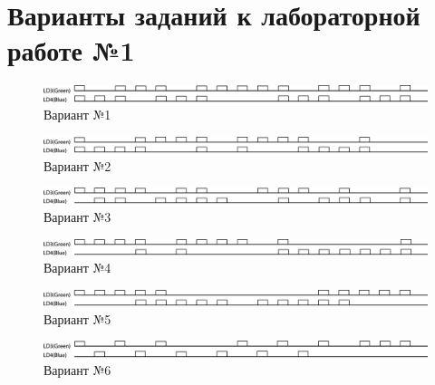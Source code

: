 \section{Варианты заданий к лабораторной работе №1}
\label{Lab1Var}
\begin{figure}[H]
\begin{center}
\includegraphics[scale=0.3]{Image/79.jpg} 
\end{center}
\caption{Вариант №1}
\end{figure}
\begin{figure}[H]
\begin{center}
\includegraphics[scale=0.3]{Image/80.jpg} 
\end{center}
\caption{Вариант №2}
\end{figure}
\begin{figure}[H]
\begin{center}
\includegraphics[scale=0.3]{Image/81.jpg} 
\end{center}
\caption{Вариант №3}
\end{figure}
\begin{figure}[H]
\begin{center}
\includegraphics[scale=0.3]{Image/82.jpg} 
\end{center}
\caption{Вариант №4}
\end{figure}
\begin{figure}[H]
\begin{center}
\includegraphics[scale=0.3]{Image/83.jpg} 
\end{center}
\caption{Вариант №5}
\end{figure}
\begin{figure}[H]
\begin{center}
\includegraphics[scale=0.3]{Image/84.jpg} 
\end{center}
\caption{Вариант №6}
\end{figure}
